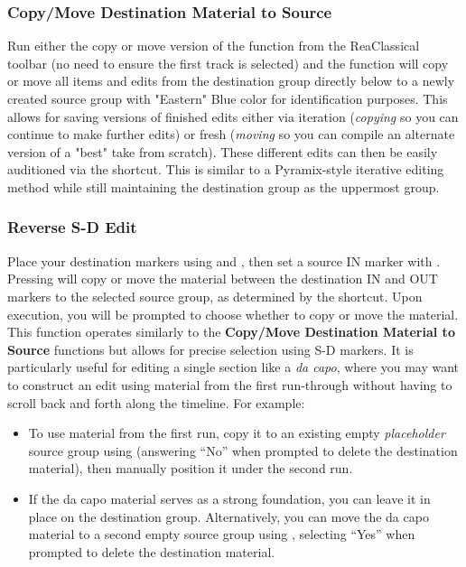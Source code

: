 \documentclass[10pt,american]{article}
\begin{document}
\subsubsection{Copy/Move Destination Material to Source}

Run either the copy or move version of the function from the ReaClassical
toolbar (no need to ensure the first track is selected) and the function will
copy or move all items and edits from the destination group directly below to a
newly created source group with "Eastern" Blue color for identification
purposes. This allows for saving versions of finished edits either via iteration
(\textit{copying} so you can continue to make further edits) or fresh
(\textit{moving} so you can compile an alternate version of a "best" take from
scratch). These different edits can then be easily auditioned via the 
shortcut. This is similar to a Pyramix-style iterative editing method while
still maintaining the destination group as the uppermost group.

\subsubsection{Reverse S-D Edit}

Place your destination markers using  and , then set a source IN
marker with . Pressing  will copy or move the material between
the destination IN and OUT markers to the selected source group, as determined
by the  shortcut. Upon execution, you will be prompted to choose whether
to copy or move the material. This function operates similarly to the
\textbf{Copy/Move Destination Material to Source} functions but allows for
precise selection using S-D markers. It is particularly useful for editing a
single section like a \textit{da capo}, where you may want to construct an edit
using material from the first run-through without having to scroll back and
forth along the timeline. For example:

\begin{itemize}
    \item To use material from the first run, copy it to an existing empty
    \textit{placeholder} source group using  (answering ``No'' when
    prompted to delete the destination material), then manually position it
    under the second run.
    \item If the da capo material serves as a strong foundation, you can leave
    it in place on the destination group. Alternatively, you can move the da
    capo material to a second empty source group using , selecting
    ``Yes'' when prompted to delete the destination material.
\end{itemize}
\end{document}
